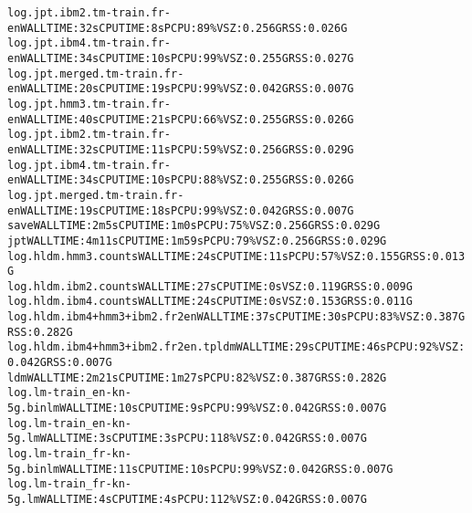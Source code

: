 \documentclass[11pt,letterpaper]{article}
\begin{document}
\begin{tiny}
\begin{alltt}
         log.jpt.ibm2.tm-train.fr-en                      WALL TIME: 32s      CPU TIME: 8s        PCPU: 89\%    VSZ: 0.256G    RSS: 0.026G
         log.jpt.ibm4.tm-train.fr-en                      WALL TIME: 34s      CPU TIME: 10s       PCPU: 99\%    VSZ: 0.255G    RSS: 0.027G
         log.jpt.merged.tm-train.fr-en                    WALL TIME: 20s      CPU TIME: 19s       PCPU: 99\%    VSZ: 0.042G    RSS: 0.007G
            log.jpt.hmm3.tm-train.fr-en                   WALL TIME: 40s      CPU TIME: 21s       PCPU: 66\%    VSZ: 0.255G    RSS: 0.026G
            log.jpt.ibm2.tm-train.fr-en                   WALL TIME: 32s      CPU TIME: 11s       PCPU: 59\%    VSZ: 0.256G    RSS: 0.029G
            log.jpt.ibm4.tm-train.fr-en                   WALL TIME: 34s      CPU TIME: 10s       PCPU: 88\%    VSZ: 0.255G    RSS: 0.026G
            log.jpt.merged.tm-train.fr-en                 WALL TIME: 19s      CPU TIME: 18s       PCPU: 99\%    VSZ: 0.042G    RSS: 0.007G
         save                                             WALL TIME: 2m5s     CPU TIME: 1m0s      PCPU: 75\%    VSZ: 0.256G    RSS: 0.029G
      jpt                                                 WALL TIME: 4m11s    CPU TIME: 1m59s     PCPU: 79\%    VSZ: 0.256G    RSS: 0.029G
         log.hldm.hmm3.counts                             WALL TIME: 24s      CPU TIME: 11s       PCPU: 57\%    VSZ: 0.155G    RSS: 0.013G
         log.hldm.ibm2.counts                             WALL TIME: 27s      CPU TIME: 0s                     VSZ: 0.119G    RSS: 0.009G
         log.hldm.ibm4.counts                             WALL TIME: 24s      CPU TIME: 0s                     VSZ: 0.153G    RSS: 0.011G
         log.hldm.ibm4+hmm3+ibm2.fr2en                    WALL TIME: 37s      CPU TIME: 30s       PCPU: 83\%    VSZ: 0.387G    RSS: 0.282G
         log.hldm.ibm4+hmm3+ibm2.fr2en.tpldm              WALL TIME: 29s      CPU TIME: 46s       PCPU: 92\%    VSZ: 0.042G    RSS: 0.007G
      ldm                                                 WALL TIME: 2m21s    CPU TIME: 1m27s     PCPU: 82\%    VSZ: 0.387G    RSS: 0.282G
         log.lm-train_en-kn-5g.binlm                      WALL TIME: 10s      CPU TIME: 9s        PCPU: 99\%    VSZ: 0.042G    RSS: 0.007G
         log.lm-train_en-kn-5g.lm                         WALL TIME: 3s       CPU TIME: 3s        PCPU: 118\%   VSZ: 0.042G    RSS: 0.007G
         log.lm-train_fr-kn-5g.binlm                      WALL TIME: 11s      CPU TIME: 10s       PCPU: 99\%    VSZ: 0.042G    RSS: 0.007G
         log.lm-train_fr-kn-5g.lm                         WALL TIME: 4s       CPU TIME: 4s        PCPU: 112\%   VSZ: 0.042G    RSS: 0.007G

\end{alltt}
\end{tiny}
\end{document}
